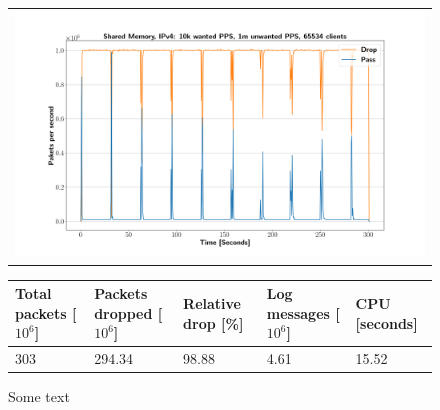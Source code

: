\begin{figure}[p]
	\label{fig:simplefail2ban:shm:ip4:1m}
	\centering
	\scriptsize
	\begin{tabular}{c}
    	\centerline{\includegraphics[width=1.2\textwidth]{images/simplefail2ban_shm_ipv4_v10k_iv1m_c65534.png}}
	\end{tabular}
	\begin{tabular}{lllll}
		\toprule
		\textbf{Total packets [$10^6$]} & \textbf{Packets dropped [$10^6$]} & \textbf{Relative drop [\%]} & \textbf{Log messages [$10^6$]} & \textbf{CPU [seconds]} \\ \midrule 
		303 & 294.34 & 98.88 & 4.61 & 15.52 \\
		\bottomrule
	\end{tabular}
	\caption[Simplefail2ban, Shared Memory, IPv4, 1m \ac{PPS}]{Some text}
\end{figure}

